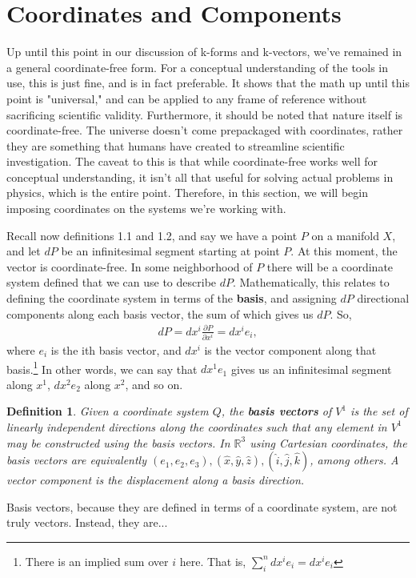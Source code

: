 \documentclass{book}
\newtheorem{defn}[equation]{Definition}
\begin{document}
\section{Coordinates and Components} 





Up until this point in our discussion of k-forms and k-vectors, we've remained in a general coordinate-free form. For a conceptual understanding of the tools in use, this is just fine, and is in fact preferable. It shows that the math up until this point is "universal," and can be applied to any frame of reference without sacrificing scientific validity. Furthermore, it should be noted that nature itself is coordinate-free. The universe doesn't come prepackaged with coordinates, rather they are something that humans have created to streamline scientific investigation. The caveat to this is that while coordinate-free works well for conceptual understanding, it isn't all that useful for solving actual problems in physics, which is the entire point. Therefore, in this section, we will begin imposing coordinates on the systems we're working with. 


Recall now definitions 1.1 and 1.2, and say we have a point $P$ on a manifold $X$, and let $dP$ be an infinitesimal segment starting at point $P$. At this moment, the vector is coordinate-free. In some neighborhood of $P$ there will be a coordinate system defined that we can use to describe $dP$. Mathematically, this relates to defining the coordinate system in terms of the \textbf{basis}, and assigning $dP$ directional components  along each basis vector, the sum of which gives us $dP$. So, \begin{gather}dP = dx^i \frac{\partial P}{\partial x^i} = dx^i e_i,\end{gather} where $e_i$ is the ith basis vector, and $dx^i$ is the vector component along that basis.\footnote{There is an implied sum over $i$ here. That is, $\sum_i^n dx^i e_i = dx^i e_i$} In other words, we can say that $dx^1e_1$ gives us an infinitesimal segment along $x^1$, $dx^2e_2$ along $x^2$, and so on. 


\begin{defn}
	Given a coordinate system $Q$, the \textbf{basis vectors} of $V^1$ is the set of linearly independent directions along the coordinates such that any element in $V^1$ may be constructed using the basis vectors. In $\mathbb{R}^3$ using Cartesian coordinates, the basis vectors are equivalently $(e_1, e_2, e_3), (\hat{x}, \hat{y}, \hat{z}), (\hat{i}, \hat{j}, \hat{k})$, among others. A vector component is the displacement along a basis direction.
\end{defn}
Basis vectors, because they are defined in terms of a coordinate system, are not truly vectors. Instead, they are...
\end{document}
